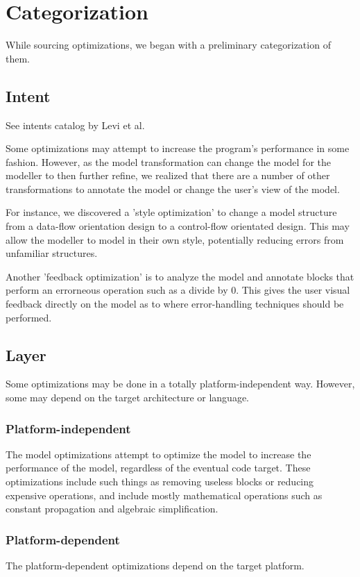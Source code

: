 \section{Categorization}

While sourcing optimizations, we began with a preliminary categorization of them. 

\subsection{Intent}

See intents catalog by Levi et al.

Some optimizations may attempt to increase the program's performance in some fashion. However, as the model transformation can change the model for the modeller to then further refine, we realized that there are a number of other transformations to annotate the model or change the user's view of the model.

For instance, we discovered a 'style optimization' to change a model structure from a data-flow orientation design to a control-flow orientated design.  This may allow the modeller to model in their own style, potentially reducing errors from unfamiliar structures.

Another 'feedback optimization' is to analyze the model and annotate blocks that perform an errorneous operation such as a divide by 0. This gives the user visual feedback directly on the model as to where error-handling techniques should be performed.

\subsection{Layer}
Some optimizations may be done in a totally platform-independent way. However, some may depend on the target architecture or language.

\subsubsection{Platform-independent}
The model optimizations attempt to optimize the model to increase the performance of the model, regardless of the eventual code target. These optimizations include such things as removing useless blocks or reducing expensive operations, and include mostly mathematical operations such as constant propagation and algebraic simplification.

\subsubsection{Platform-dependent}
The platform-dependent optimizations depend on the target platform. 

